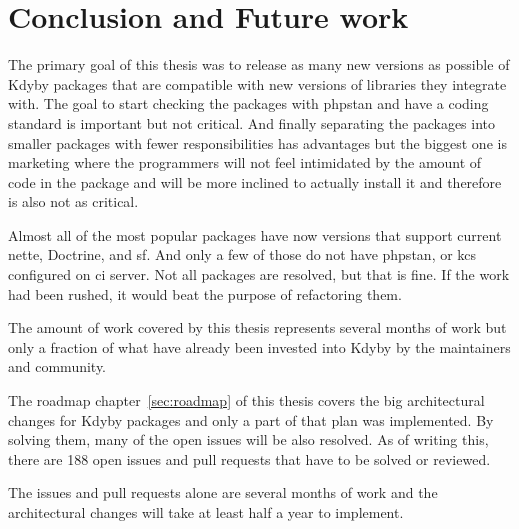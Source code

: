 \chapter{Conclusion and Future work}

The primary goal of this thesis was to release as many new versions as possible of Kdyby packages that are compatible with new versions of libraries they integrate with. The goal to start checking the packages with \gls{phpstan} and have a coding standard is important but not critical. And finally separating the packages into smaller packages with fewer responsibilities has advantages but the biggest one is marketing where the programmers will not feel intimidated by the amount of code in the package and will be more inclined to actually install it and therefore is also not as critical.

Almost all of the most popular packages have now versions that support current \gls{nette}, Doctrine, and \gls{sf}. And only a few of those do not have \gls{phpstan}, or \acrlong{kcs} configured on \gls{ci} server. Not all packages are resolved, but that is fine. If the work had been rushed, it would beat the purpose of refactoring them.

The amount of work covered by this thesis represents several months of work but only a fraction of what have already been invested into Kdyby by the maintainers and community.

The roadmap chapter~\ref{sec:roadmap} of this thesis covers the big architectural changes for Kdyby packages and only a part of that plan was implemented. By solving them, many of the open issues will be also resolved. As of writing this, there are 188 open issues and pull requests that have to be solved or reviewed.

The issues and pull requests alone are several months of work and the architectural changes will take at least half a year to implement.
